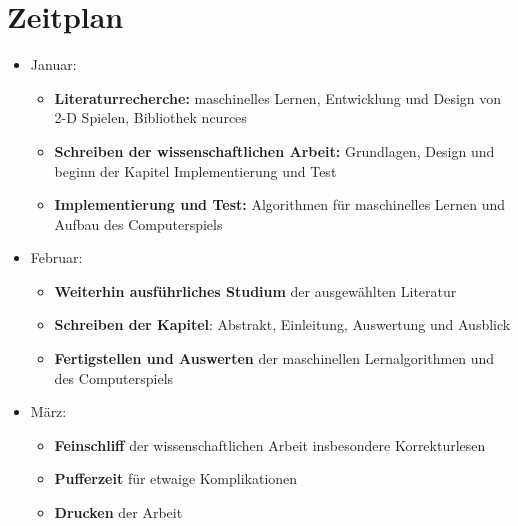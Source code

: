\documentclass[12pt,a4paper]{article}
\begin{document}
\section*{Zeitplan}
\begin{itemize}
	\item Januar:
	\begin{itemize}
		\item \textbf{Literaturrecherche:} maschinelles Lernen, Entwicklung und Design von 2-D Spielen, Bibliothek ncurces
		\item \textbf{Schreiben der wissenschaftlichen Arbeit:} Grundlagen, Design und beginn der Kapitel Implementierung und Test
		\item \textbf{Implementierung und Test:} Algorithmen für maschinelles Lernen und Aufbau des Computerspiels
	\end{itemize}
	\item Februar:
	\begin{itemize}
		\item \textbf{Weiterhin ausführliches Studium} der ausgewählten Literatur
		\item \textbf{Schreiben der Kapitel}: Abstrakt, Einleitung, Auswertung und Ausblick
		\item \textbf{Fertigstellen und Auswerten} der maschinellen Lernalgorithmen und des Computerspiels
	\end{itemize}
	\item März:
	\begin{itemize}
		\item \textbf{Feinschliff} der wissenschaftlichen Arbeit insbesondere Korrekturlesen
		\item \textbf{Pufferzeit} für etwaige Komplikationen
		\item \textbf{Drucken} der Arbeit
	\end{itemize}
\end{itemize}
\end{document}
